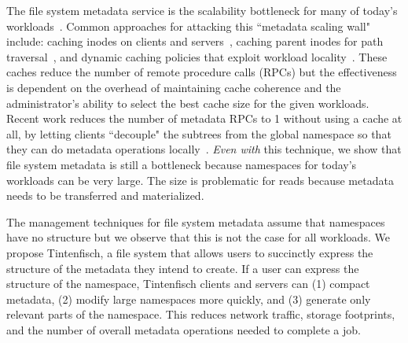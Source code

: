 The file system metadata service is the scalability bottleneck for many of
today's workloads~\cite{roselli:atec2000-FS-workloads,
abad:techreport2012-fstrace, abad:ucc2012-mimesis,
alam:pdsw2011-metadata-scaling, weil:osdi2006-ceph}.  Common approaches for
attacking this ``metadata scaling wall" include: caching inodes on clients and
servers~\cite{depardon:tech13-survey, sinnamohideen:atc2010-ursa,
hildebrand:msst2005-pnfs, devulapalli:ipdps07-pvfs2, welch:fast2008-panasas},
caching parent inodes for path traversal~\cite{patil:fast2011-giga+,
ren:sc2014-indexfs, brandt:msst2003-lh, weil:sc2004-dyn-metadata,
ren:sc2014-indexfs}, and dynamic caching policies that exploit workload
locality~\cite{xing:sc2009-skyfs, zhu:pds2008-hba, li:msst2006-dynamic}.  These
caches reduce the number of remote procedure calls (RPCs) but the effectiveness
is dependent on the overhead of maintaining cache coherence and the
administrator's ability to select the best cache size for the given workloads.
Recent work reduces the number of metadata RPCs to 1 without using a cache at
all, by letting clients ``decouple" the subtrees from the global namespace so
that they can do metadata operations locally~\cite{zheng:pdsw2015-deltafs,
sevilla:ipdps18-cudele}. {\it Even with} this technique, we show that file
system metadata is still a bottleneck because namespaces for today's workloads
can be very large. The size is problematic for reads because metadata needs to
be transferred and materialized.

The management techniques for file system metadata assume that namespaces have
no structure but we observe that this is not the case for all workloads. We
propose Tintenfisch, a file system that allows users to succinctly express the
structure of the metadata they intend to create.  If a user can express the
structure of the namespace, Tintenfisch clients and servers can (1) compact
metadata, (2) modify large namespaces more quickly, and (3) generate only
relevant parts of the namespace. This reduces network traffic, storage
footprints, and the number of overall metadata operations needed to complete a
job. 

